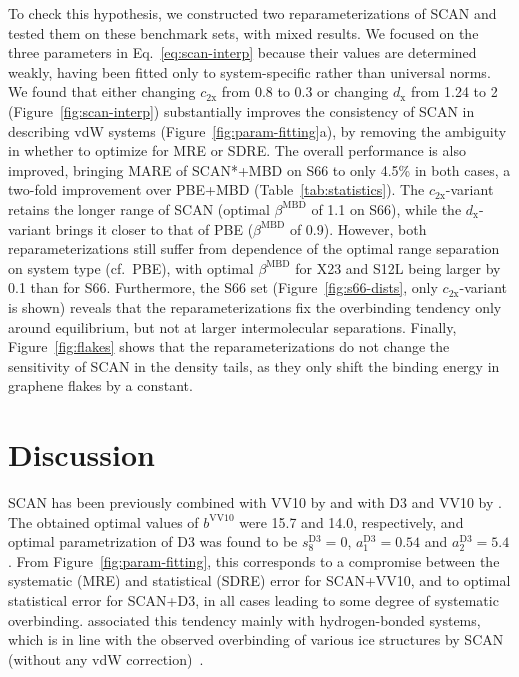 To check this hypothesis, we constructed two reparameterizations of SCAN and tested them on these benchmark sets, with mixed results.
We focused on the three parameters in Eq.~\ref{eq:scan-interp} because their values are determined weakly, having been fitted only to system-specific rather than universal norms.
We found that either changing $c_\mathrm{2x}$ from 0.8 to 0.3 or changing $d_\mathrm x$ from 1.24 to 2 (Figure~\ref{fig:scan-interp}) substantially improves the consistency of SCAN in describing vdW systems (Figure~\ref{fig:param-fitting}a), by removing the ambiguity in whether to optimize for MRE or SDRE\@.
The overall performance is also improved, bringing MARE of SCAN*+MBD on S66 to only 4.5\% in both cases, a two-fold improvement over PBE+MBD (Table~\ref{tab:statistics}).
The $c_\mathrm{2x}$-variant retains the longer range of SCAN (optimal $\beta^\text{MBD}$ of 1.1 on S66), while the $d_\mathrm x$-variant brings it closer to that of PBE ($\beta^\text{MBD}$ of 0.9).
However, both reparameterizations still suffer from dependence of the optimal range separation on system type (cf.\ PBE), with optimal $\beta^\text{MBD}$ for X23 and S12L being larger by 0.1 than for S66.
Furthermore, the S66 set (Figure~\ref{fig:s66-dists}, only $c_\mathrm{2x}$-variant is shown) reveals that the reparameterizations fix the overbinding tendency only around equilibrium, but not at larger intermolecular separations.
Finally, Figure~\ref{fig:flakes} shows that the reparameterizations do not change the sensitivity of SCAN in the density tails, as they only shift the binding energy in graphene flakes by a constant.

\section{Discussion}

SCAN has been previously combined with VV10 by \citet{PengPRX16} and with D3 and VV10 by \citet{BrandenburgPRB16}.
The obtained optimal values of $b^\text{VV10}$ were 15.7 and 14.0, respectively, and optimal parametrization of D3 was found to be $s_8^\text{D3}=0$, $a_1^\text{D3}=0.54$ and $a_2^\text{D3}=5.4$.
From Figure~\ref{fig:param-fitting}, this corresponds to a compromise between the systematic (MRE) and statistical (SDRE) error for SCAN+VV10, and to optimal statistical error for SCAN+D3, in all cases leading to some degree of systematic overbinding.
\citet{BrandenburgPRB16} associated this tendency mainly with hydrogen-bonded systems, which is in line with the observed overbinding of various ice structures by SCAN (without any vdW correction)~\cite{ChenPRB16}.


